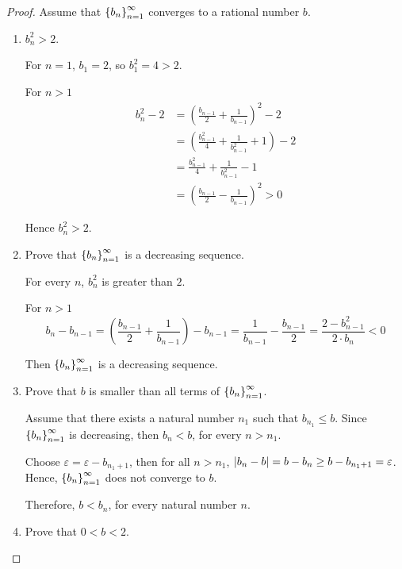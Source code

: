 \begin{proof}
    Assume that ${\left\{{b_{n}}\right\}}^{\infty}_{n=1}$ converges to a rational number $b$.
    \begin{enumerate}[label={\textbf{Step \arabic*.}},itemindent=1cm]
        \item ${b^{2}_{n}} > 2$.

              For $n = 1$, $b_{1} = 2$, so $b^{2}_{1} = 4 > 2$.

              For $n > 1$
              \begin{align*}
                  {b^{2}_{n}} - 2 & = {\left(\frac{b_{n-1}}{2} + \frac{1}{b_{n-1}}\right)}^{2} - 2         \\
                                  & = {\left(\frac{b^{2}_{n-1}}{4} + \frac{1}{b^{2}_{n-1}} + 1\right)} - 2 \\
                                  & = \frac{b^{2}_{n-1}}{4} + \frac{1}{b^{2}_{n-1}} - 1                    \\
                                  & = {\left(\frac{b_{n-1}}{2} - \frac{1}{b_{n-1}}\right)}^{2} > 0
              \end{align*}

              Hence $b^{2}_{n} > 2$.
        \item Prove that ${\left\{{b_{n}}\right\}}^{\infty}_{n=1}$ is a decreasing sequence.

              For every $n$, ${b^{2}_{n}}$ is greater than $2$.

              For $n > 1$
              \[
                  b_{n} - b_{n-1} = \left(\frac{b_{n-1}}{2} + \frac{1}{b_{n-1}}\right) - b_{n-1} = \frac{1}{b_{n-1}} - \frac{b_{n-1}}{2} = \frac{2 - {b}^{2}_{n-1}}{2\cdot b_{n}} < 0
              \]

              Then ${\left\{{b_{n}}\right\}}^{\infty}_{n=1}$ is a decreasing sequence.
        \item Prove that $b$ is smaller than all terms of ${\left\{{b_{n}}\right\}}^{\infty}_{n=1}$.

              Assume that there exists a natural number $n_{1}$ such that $b_{n_{1}}\le b$. Since ${\left\{{b_{n}}\right\}}^{\infty}_{n=1}$ is decreasing, then $b_{n} < b$, for every $n > n_{1}$.

              Choose $\varepsilon = \varepsilon - b_{n_{1} + 1}$, then for all $n > n_{1}$, $\left\vert{b_{n} - b}\right\vert = b - b_{n} \ge b - b_{n_{1} + 1} = \varepsilon$. Hence, ${\left\{{b_{n}}\right\}}^{\infty}_{n=1}$ does not converge to $b$.

              Therefore, $b < b_{n}$, for every natural number $n$.
        \item Prove that $0 < b < 2$.


\end{enumerate}
\end{proof}
